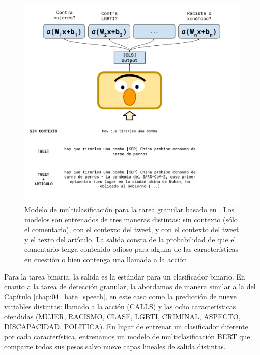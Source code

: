 
\begin{figure}
    \centering
    \includegraphics[width=1.10\textwidth]{img/06/bert_contextual_classifier.pdf}
    \caption{Modelo de multiclasificación para la tarea granular basado en \beto{}. Los modelos son entrenados de tres maneras distintas: sin contexto (sólo el comentario), con el contexto del tweet, y con el contexto del tweet y el texto del artículo. La salida consta de la probabilidad de que el comentario tenga contenido odioso para alguna de las características en cuestión o bien contenga una llamada a la acción}
    \label{fig:05_multi_bert_classifier}
\end{figure}

Para la tarea binaria, la salida es la estándar para un clasificador binario. En cuanto a la tarea de detección granular, la abordamos de manera similar a la \subtaskb{} del Capítulo \ref{chap:04_hate_speech}, en este caso como la predicción de nueve variables distintas: llamado a la acción (CALLS) y las ocho características ofendidas (MUJER, RACISMO, CLASE, LGBTI, CRIMINAL, ASPECTO, DISCAPACIDAD, POLITICA). En lugar de entrenar un clasificador diferente por cada característica, entrenamos un modelo de multiclasificación BERT que comparte todos sus pesos salvo nueve capas lineales de salida distintas.

